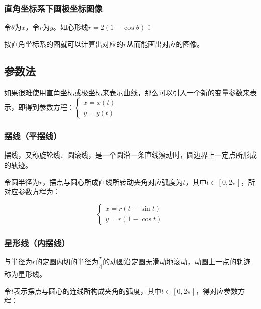 \documentclass[UTF8, 12pt]{ctexart}
\begin{document}
\subsubsection{直角坐标系下画极坐标图像}

令$\theta$为$x$，令$r$为$y$。如心形线$r=2(1-\cos\theta)$：


按直角坐标系的图就可以计算出对应的$r$从而能画出对应的图像。

\subsection{参数法}

如果很难使用直角坐标或极坐标来表示曲线，那么可以引入一个新的变量参数来表示，即得到参数方程：$
    \left\{
    \begin{array}{lcl}
        x=x(t) \\
        y=y(t)
    \end{array}
    \right.
$

\subsubsection{摆线（平摆线）}

摆线，又称旋轮线、圆滚线，是一个圆沿一条直线滚动时，圆边界上一定点所形成的轨迹。

令圆半径为$r$，摆点与圆心所成直线所转动夹角对应弧度为$t$，其中$t\in[0,2\pi]$，所对应参数方程为：

$$
    \left\{
    \begin{array}{lcl}
        x=r(t-\sin t) \\
        y=r(1-\cos t)
    \end{array}
    \right.
$$

\subsubsection{星形线（内摆线）}

与半径为$r$的定圆内切的半径为$\dfrac{r}{4}$的动圆沿定圆无滑动地滚动，动圆上一点的轨迹称为星形线。

令$t$表示摆点与圆心的连线所构成夹角的弧度，其中$t\in[0,2\pi]$，得对应参数方程：
\end{document}
